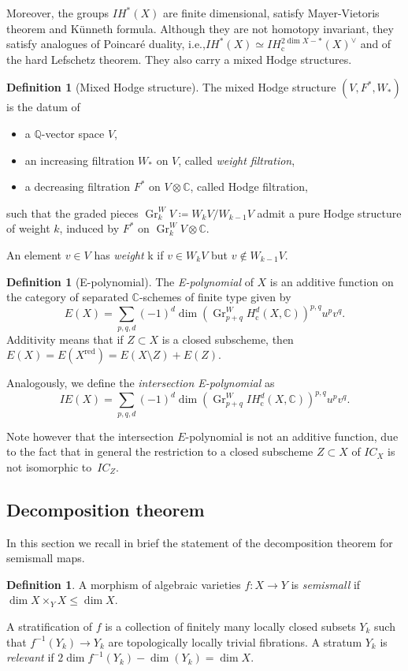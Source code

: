 \documentclass[11pt]{article}
\newcommand{\ie}{i.e.,\xspace}
\newcommand{\cc}{\mathrm{c}}
\newcommand{\IC}{\mathit{IC}}
\newcommand{\IE}{\mathit{IE}}
\newcommand{\IH}{\mathit{IH}}
\theoremstyle{definition}
\newtheorem{defn}[thm]{Definition}
\newcommand{\CC}{\mathbb{C}}
\newcommand{\QQ}{\mathbb{Q}}
\newcommand{\Gr}{\operatorname{Gr}}
\begin{document}
Moreover, the groups $\IH^*(X)$ are finite dimensional, satisfy Mayer-Vietoris theorem and Künneth formula. Although they are not homotopy invariant, they satisfy analogues of Poincaré duality, \ie $\IH^*(X) \simeq \IH^{2\dim X -*}_{\cc}(X)^{\vee}$ and of the hard Lefschetz theorem.
They also carry a mixed Hodge structures.

\begin{defn}[Mixed Hodge structure] The mixed Hodge structure $(V, F^{*}, W_*)$ is the datum of
\begin{itemize}
\item a $\QQ$-vector space $V$,
		\item an increasing filtration $W_{*}$ on $V$, called \emph{weight filtration},
		\item a decreasing filtration $F^{*}$ on $V \otimes \CC$, called Hodge filtration,
	\end{itemize}
such that the graded pieces $\Gr_k^W V \coloneqq W_kV/W_{k-1}V$ admit a pure Hodge structure of weight $k$, induced by $F^{*}$ on $\Gr_k^W V \otimes \CC$.

An element $v \in V$ has \emph{weight} k if $v \in W_kV$ but $v \not\in W_{k-1}V$.
\end{defn}

\begin{defn}[E-polynomial] The \emph{E-polynomial} of $X$ is an additive function on the category of separated $\CC$-schemes of finite type given by
\[
E(X) = \sum_{p,q,d}(-1)^d \dim ( \Gr^W_{p+q} H^d_{\cc}(X, \CC))^{p,q} u^pv^q.
\]
Additivity means that if $Z \subset X$ is a closed subscheme, then $E(X)=E(X^{\mathrm{red}})=E(X \setminus Z)+ E(Z)$.

Analogously, we define the \emph{intersection E-polynomial} as
\[
\IE(X) = \sum_{p,q,d}(-1)^d \dim ( \Gr^W_{p+q} \IH^d_{\cc}(X, \CC))^{p,q} u^pv^q.
\]
\end{defn}

Note however that the intersection $E$-polynomial is not an additive function, due to the fact that in general the restriction to a closed subscheme $Z\subset X$ of $\IC_X$ is not isomorphic to~$\IC_Z$.

\subsection{Decomposition theorem}
In this section we recall in brief the statement of the decomposition theorem for semismall maps.
\begin{defn}
A morphism of algebraic varieties $f\colon X \to Y$ is \emph{semismall} if $\dim X \times_Y X \leq \dim X$.
\end{defn}
A stratification of $f$ is a collection of finitely many locally closed subsets $Y_k$ such that $f^{-1}(Y_k) \to Y_k$ are topologically locally trivial fibrations. A stratum $Y_k$ is \emph{relevant} if $2 \dim f^{-1}(Y_k) - \dim(Y_k)=\dim X$.
\end{document}
